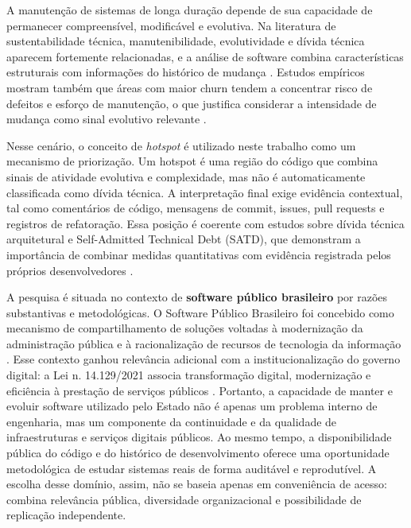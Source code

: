 \documentclass[12pt]{article}
\begin{document}
A manutenção de sistemas de longa duração depende de sua capacidade de permanecer compreensível, modificável e evolutiva. Na literatura de sustentabilidade técnica, manutenibilidade, evolutividade e dívida técnica aparecem fortemente relacionadas, e a análise de software combina características estruturais com informações do histórico de mudança \cite{venters2023sustainable}. Estudos empíricos mostram também que áreas com maior churn tendem a concentrar risco de defeitos e esforço de manutenção, o que justifica considerar a intensidade de mudança como sinal evolutivo relevante \cite{nagappan2005churn}.

Nesse cenário, o conceito de \emph{hotspot} é utilizado neste trabalho como um mecanismo de priorização. Um hotspot é uma região do código que combina sinais de atividade evolutiva e complexidade, mas não é automaticamente classificada como dívida técnica. A interpretação final exige evidência contextual, tal como comentários de código, mensagens de commit, issues, pull requests e registros de refatoração. Essa posição é coerente com estudos sobre dívida técnica arquitetural e Self-Admitted Technical Debt (SATD), que demonstram a importância de combinar medidas quantitativas com evidência registrada pelos próprios desenvolvedores \cite{sutoyo2025tracing,potdar2014satd,li2023satd}.

A pesquisa é situada no contexto de \textbf{software público brasileiro} por razões substantivas e metodológicas. O Software Público Brasileiro foi concebido como mecanismo de compartilhamento de soluções voltadas à modernização da administração pública e à racionalização de recursos de tecnologia da informação \cite{govsoftwarepublico,alves2009spb,pereira2019spb}. Esse contexto ganhou relevância adicional com a institucionalização do governo digital: a Lei n. 14.129/2021 associa transformação digital, modernização e eficiência à prestação de serviços públicos \cite{leigovernodigital}. Portanto, a capacidade de manter e evoluir software utilizado pelo Estado não é apenas um problema interno de engenharia, mas um componente da continuidade e da qualidade de infraestruturas e serviços digitais públicos. Ao mesmo tempo, a disponibilidade pública do código e do histórico de desenvolvimento oferece uma oportunidade metodológica de estudar sistemas reais de forma auditável e reprodutível. A escolha desse domínio, assim, não se baseia apenas em conveniência de acesso: combina relevância pública, diversidade organizacional e possibilidade de replicação independente.
\end{document}
